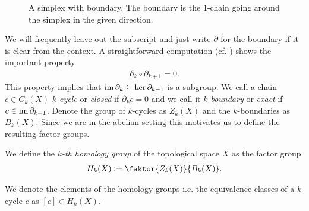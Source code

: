 \documentclass[../master_thesis.tex]{subfiles}
\begin{document}

\begin{figure}\centering
    \scalebox{2}{
        \begin{tikzpicture}
            \path [draw=black,postaction={on each segment={mid arrow=black}}]
                (-1,0) -- (1,0) -- (0,1.73205) -- (-1,0) --cycle;
        \end{tikzpicture}
    }
    \caption{A simplex with boundary. The boundary is the $1$-chain going around 
    the simplex in the given direction.}
\end{figure}


We will frequently leave out the subscript and just write $\partial$ for the boundary 
if it is clear from the context.
A straightforward computation (cf. \cite[Lemma 1.6]{topology_and_geometry}) shows the 
important property 
\begin{align*}
    \partial_k \circ \partial_{k+1} = 0.
\end{align*}
This property implies that $\operatorname{im} \partial_k\subseteq \ker \partial_{k-1}$ is 
a subgroup. We call a chain $c \in C_k(X)$ \textit{$k$-cycle} or \textit{closed} if $\partial_k c = 0$ and 
we call it \textit{$k$-boundary} or \textit{exact} if $c \in \operatorname{im} \partial_{k+1}$. 
Denote the group of $k$-cycles as $Z_k(X)$ and the $k$-boundaries as $B_k(X)$.
Since we are in the abelian setting this motivates us to define 
the resulting factor groups.
\begin{definition}
    We define the \textit{$k$-th homology group} of the topological space $X$ as the factor group
    \begin{align*}
        H_k(X) \vcentcolon= \faktor{Z_k(X)}{B_k(X)}.
    \end{align*} 
\end{definition}
We denote the elements of the homology groups i.e. the equivalence classes of a 
$k$-cycle $c$ as $[c] \in H_k(X)$.
\end{document}
